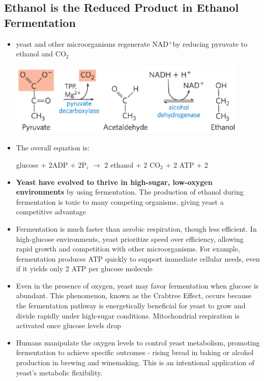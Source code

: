 \documentclass[10pt]{article}
\newcommand{\water}{\text{H$_2$O}}
\newcommand{\pc}{$^+$}
\begin{document}
\subsection*{Ethanol is the Reduced Product in Ethanol Fermentation}
\begin{itemize}
	\item yeast and other microorganisms regenerate NAD\pc by reducing pyruvate to ethanol and CO$_2$
	\begin{center} 
        \includegraphics*[width=0.9\textwidth]{L2_13.png} 
    \end{center}
    \item The overall equation is:
    \begin{center} 
        glucose + 2ADP + 2P$_i$ $\rightarrow$ 2 ethanol + 2 CO$_2$ + 2 ATP + 2 \water
    \end{center}
\end{itemize}
\begin{itemize}
	\item \textbf{Yeast have evolved to thrive in high-sugar, low-oxygen environments} by using fermentation.  The production of ethanol during fermentation is toxic to many competing organisms, giving yeast a competitive advantage
	\item Fermentation is much faster than aerobic respiration, though less efficient.  In high-glucose environments, yeast prioritize speed over efficiency, allowing rapid growth and competition with other microorganisms.  For example, fermentation produces ATP quickly to support immediate cellular needs, even if it yields only 2 ATP per glucose molecule
	\item Even in the presence of oxygen, yeast may favor fermentation when glucose is abundant.  This phenomenon, known as the Crabtree Effect, occurs because the fermentation pathway is energetically beneficial for yeast to grow and divide rapidly under high-sugar conditions.  Mitochondrial respiration is activated once glucose levels drop
	\item Humans manipulate the oxygen levels to control yeast metabolism, promoting fermentation to achieve specific outcomes - rising bread in baking or alcohol production in brewing and winemaking.  This is an intentional application of yeast's metabolic flexibility.
\end{itemize}
\end{document}
